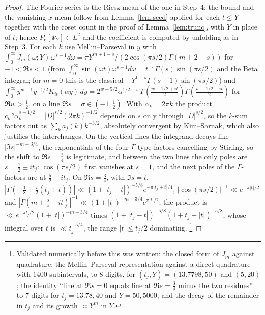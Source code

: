 \documentclass[11pt,a4paper]{article}
\theoremstyle{remark}\newtheorem{remark}[theorem]{Remark}
\begin{document}
\begin{proof}
The Fourier series is the Riesz mean of the one in Step~4; the bound and the vanishing $x$-mean follow from
Lemma~\ref{lem:seed} applied for each $t\le Y$ together with the coset count in the proof of Lemma~\ref{lem:trunc}, with
$Y$ in place of $t$; hence $P_e[\Psi_Y]\in L^2$ and the coefficient is computed by unfolding as in Step~3. For each $k$
use Mellin--Parseval in $y$ with
$\int_0^\infty J_m(\omega;Y)\,\omega^{s-1}d\omega=\pi Y^{m+1-s}/(2\cos(\pi s/2)\Gamma(m+2-s))$ for $-1<\Re s<1$ (from
$\int_0^\infty\sin(\omega t)\omega^{s-1}d\omega=t^{-s}\Gamma(s)\sin(\pi s/2)$ and the Beta integral; for $m=0$ this is the
classical $-Y^{1-s}\Gamma(s-1)\sin(\pi s/2)$) and
$\int_0^\infty y^{w-1}y^{-1/2}K_{it}(\alpha y)\,dy=2^{w-5/2}\alpha^{1/2-w}\Gamma(\tfrac{w-1/2+it}2)\Gamma(\tfrac{w-1/2-it}2)$ for
$\Re w>\tfrac12$, on a line $\Re s=\sigma\in(-1,\tfrac12)$. With $\alpha_k=2\pi k$ the product
$c_k^{-s}\alpha_k^{s-1/2}=|D|^{s/2}(2\pi k)^{-1/2}$ depends on $s$ only through $|D|^{s/2}$, so the $k$-sum factors out as
$\sum_ka_j(k)k^{-3/2}$, absolutely convergent by Kim--Sarnak, which also justifies the interchanges. On the vertical
lines the integrand decays like $|\Im s|^{-m-3/4}$, the exponentials of the four $\Gamma$-type factors cancelling by
Stirling, so the shift to $\Re s=\tfrac34$ is legitimate, and between the two lines the only poles are
$s=\tfrac12\pm it_j$: $\cos(\pi s/2)$ first vanishes at $s=1$, and the next poles of the $\Gamma$-factors are at
$\tfrac52\pm it_j$. On $\Re s=\tfrac34$, with $\Im s=t$,
$|\Gamma(-\tfrac18+\tfrac i2(t_j\mp t))|\ll(1+|t_j\mp t|)^{-5/8}e^{-\pi|t_j\mp t|/4}$, $|\cos(\pi s/2)|^{-1}\ll e^{-\pi|t|/2}$ and
$|\Gamma(m+\tfrac54-it)|^{-1}\ll(1+|t|)^{-m-3/4}e^{\pi|t|/2}$; the product is $\ll e^{-\pi t_j/2}(1+|t|)^{-m-3/4}$ times
$(1+|t_j-t|)^{-5/8}(1+t_j+|t|)^{-5/8}$, whose integral over $t$ is $\ll t_j^{-5/4}$, the range $|t|\le t_j/2$ dominating.
\footnote{Validated numerically before this was written: the closed form of $J_m$ against quadrature; the Mellin--Parseval
representation against a direct quadrature with $1400$ subintervals, to $8$ digits, for $(t_j,Y)=(13.7798,50)$ and
$(5,20)$; the identity ``line at $\Re s=0$ equals line at $\Re s=\tfrac34$ minus the two residues'' to $7$ digits for
$t_j=13.78,40$ and $Y=50,5000$; and the decay of the remainder in $t_j$ and its growth $\asymp Y^m$ in $Y$.}
\end{proof}
\end{document}
